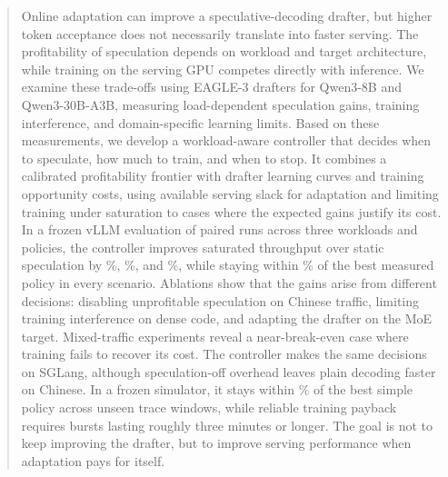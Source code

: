 \begin{abstract}
Online adaptation can improve a speculative-decoding drafter, but higher token acceptance does not necessarily translate into faster serving. The profitability of speculation depends on workload and target architecture, while training on the serving GPU competes directly with inference. We examine these trade-offs using EAGLE-3 drafters for Qwen3-8B and Qwen3-30B-A3B, measuring load-dependent speculation gains, training interference, and domain-specific learning limits. Based on these measurements, we develop a workload-aware controller that decides when to speculate, how much to train, and when to stop. It combines a calibrated profitability frontier with drafter learning curves and training opportunity costs, using available serving slack for adaptation and limiting training under saturation to cases where the expected gains justify its cost. In a frozen vLLM evaluation of  paired runs across three workloads and  policies, the controller improves saturated throughput over static speculation by \%, \%, and \%, while staying within \% of the best measured policy in every scenario. Ablations show that the gains arise from different decisions: disabling unprofitable speculation on Chinese traffic, limiting training interference on dense code, and adapting the drafter on the MoE target. Mixed-traffic experiments reveal a near-break-even case where training fails to recover its cost. The controller makes the same decisions on SGLang, although speculation-off overhead leaves plain decoding faster on Chinese. In a frozen simulator, it stays within \% of the best simple policy across  unseen trace windows, while reliable training payback requires bursts lasting roughly three minutes or longer. The goal is not to keep improving the drafter, but to improve serving performance when adaptation pays for itself.
\end{abstract}